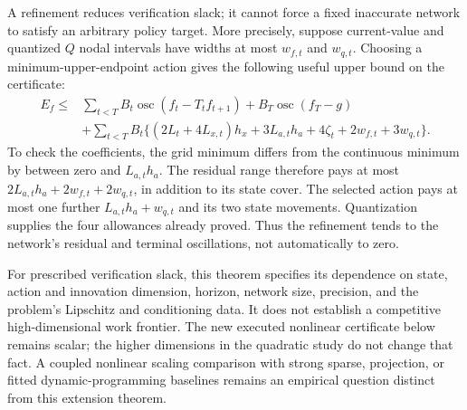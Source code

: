 A refinement reduces verification slack; it cannot force a fixed inaccurate
network to satisfy an arbitrary policy target. More precisely, suppose
current-value and quantized $Q$ nodal intervals have widths at most
$w_{f,t}$ and $w_{q,t}$. Choosing a minimum-upper-endpoint action gives the
following useful upper bound on the certificate:
\begin{align*}
 E_f\leq &\sum_{t<T}B_t\operatorname{osc}(f_t-T_tf_{t+1})
       +B_T\operatorname{osc}(f_T-g)\\
 &+\sum_{t<T}B_t\{(2L_t+4L_{x,t})h_x+3L_{a,t}h_a
              +4\zeta_t+2w_{f,t}+3w_{q,t}\}.
\end{align*}
To check the coefficients, the grid minimum differs from the continuous
minimum by between zero and $L_{a,t}h_a$. The residual range therefore
pays at most $2L_{a,t}h_a+2w_{f,t}+2w_{q,t}$, in addition to its state
cover. The selected action pays at most one further $L_{a,t}h_a+w_{q,t}$
and its two state movements. Quantization supplies the four allowances
already proved. Thus the refinement tends to the network's residual and
terminal oscillations, not automatically to zero.

For prescribed verification slack, this theorem specifies its dependence
on state, action and innovation dimension, horizon, network size, precision,
and the problem's Lipschitz and conditioning data. It does not establish a
competitive high-dimensional work frontier. The new executed nonlinear
certificate below remains scalar; the higher dimensions in the quadratic
study do not change that fact. A coupled nonlinear scaling comparison with
strong sparse, projection, or fitted dynamic-programming baselines remains
an empirical question distinct from this extension theorem.
